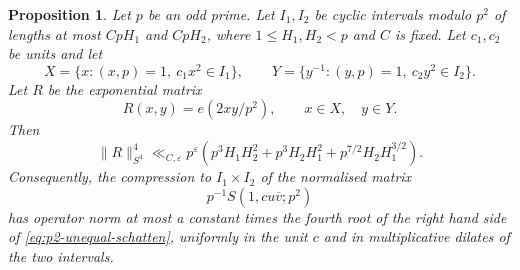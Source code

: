 \documentclass[12pt, a4paper]{amsart}
\numberwithin{equation}{section}
\newcommand{\e}{e}
\newcommand{\ep}{\varepsilon}
\renewcommand{\bar}[1]{\overline{#1}}
\renewcommand{\le}{\leqslant}
\theoremstyle{plain}
\newtheorem{prop}[lem]{Proposition}
\begin{document}
\begin{prop}\label{prop:p2-unequal-local-operator}
Let $p$ be an odd prime. Let $I_1,I_2$ be cyclic intervals modulo $p^2$ of lengths at most $CpH_1$ and $CpH_2$, where $1\le H_1,H_2<p$ and $C$ is fixed. Let $c_1,c_2$ be units and let
$$
X=\{x:(x,p)=1,\ c_1x^2\in I_1\},
\qquad
Y=\{y^{-1}:(y,p)=1,\ c_2y^2\in I_2\}.
$$
Let $R$ be the exponential matrix
$$
R(x,y)=\e(2xy/p^2),\qquad x\in X,\quad y\in Y.
$$
Then
\begin{equation}\label{eq:p2-unequal-schatten}
\|R\|_{S^4}^4
\ll_{C,\ep}p^\ep
\left(
p^3H_1H_2^2+p^3H_2H_1^2
+p^{7/2}H_2H_1^{3/2}\right).
\end{equation}
Consequently, the compression to $I_1\times I_2$ of the normalised matrix
$$
p^{-1}S(1,cu\bar v;p^2)
$$
has operator norm at most a constant times the fourth root of the right hand side of \eqref{eq:p2-unequal-schatten}, uniformly in the unit $c$ and in multiplicative dilates of the two intervals.
\end{prop}
\end{document}
